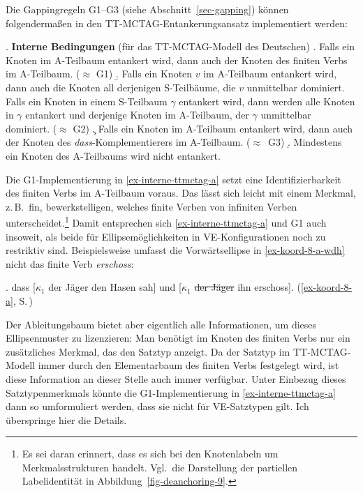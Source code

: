 Die Gappingregeln G1--G3 (siehe Abschnitt~\ref{sec-gapping}) können folgenderma\ss en in den TT-MC\-TAG-Entankerungsansatz implementiert werden: 

\ex. {\bf Interne Bedingungen} (für das TT-MCTAG-Modell des Deutschen) \label{ex-interne-ttmctag}
\a. Falls ein Knoten im A-Teilbaum entankert wird, dann auch der Knoten des finiten Verbs im A-Teilbaum. ($\approx$ G1)\label{ex-interne-ttmctag-a}
\b. Falls ein Knoten $v$ im A-Teilbaum entankert wird, dann auch die Knoten all derjenigen S-Teilbäume, die $v$ unmittelbar dominiert. Falls ein Knoten in einem S-Teilbaum $\gamma$ entankert wird, dann werden alle Knoten in $\gamma$ entankert und derjenige Knoten im A-Teilbaum, der $\gamma$ unmittelbar dominiert. ($\approx$ G2)\label{ex-interne-ttmctag-b}
\c. Falls ein Knoten im A-Teilbaum entankert wird, dann auch der Knoten des \emph{dass}-Komplementierers im A-Teilbaum. ($\approx$~G3)\label{ex-interne-ttmctag-c}
\d. Mindestens ein Knoten des A-Teilbaums wird nicht entankert.\label{ex-interne-ttmctag-d} %

Die G1-Implementierung in \ref{ex-interne-ttmctag-a} setzt eine Identifizierbarkeit des finiten Verbs im A-Teil\-baum voraus. Das lässt sich leicht mit einem Merkmal, z.\,B.\ {\sc fin}, bewerkstelligen, welches finite Verben von infiniten Verben unterscheidet.\footnote{Es sei daran erinnert, dass es sich bei den Knotenlabeln um Merkmalsstrukturen handelt. Vgl.\ die Darstellung der partiellen Labelidentität in Abbildung~\ref{fig-deanchoring-9}.} Damit entsprechen sich \ref{ex-interne-ttmctag-a} und G1 auch insoweit, als beide für Ellipsemöglichkeiten in VE-Konfigurationen noch zu restriktiv sind. Beispielsweise umfasst die Vorwärtsellipse in \ref{ex-koord-8-a-wdh} nicht das finite Verb {\it erschoss}: 

\ex. \label{ex-koord-8-a-wdh}dass [$\kappa_1$ der Jäger den Hasen sah] und [$\kappa_1$ \sout{der Jäger} ihn erschoss]. \hfill (\ref{ex-koord-8-a}, S.\,\pageref{ex-koord-8-a})     

Der Ableitungsbaum bietet aber eigentlich alle Informationen, um dieses Ellipsenmuster zu lizenzieren: Man benötigt im Knoten des finiten Verbs nur ein zusätzliches Merkmal, das den Satztyp anzeigt. Da der Satztyp im TT-MCTAG-Modell immer durch den Elementarbaum des finiten Verbs festgelegt wird, ist diese Information an dieser Stelle auch immer verfügbar. Unter Einbezug dieses Satztypenmerkmals könnte die G1-Implementierung in \ref{ex-interne-ttmctag-a} dann so umformuliert werden, dass sie nicht für VE-Satztypen gilt. Ich überspringe hier die Details. 

